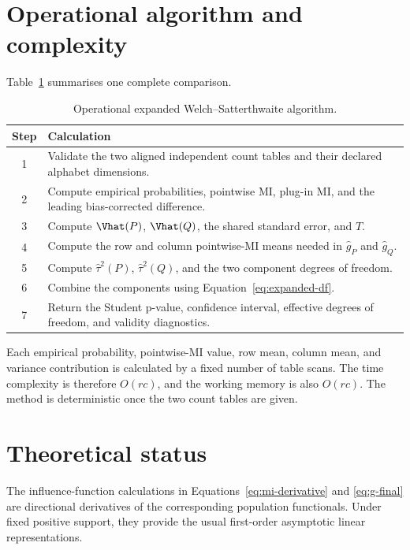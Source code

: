\section{Operational algorithm and complexity}

Table~\ref{tab:expanded-algorithm} summarises one complete comparison.

\begin{table}[htbp]
\centering
\caption{Operational expanded Welch--Satterthwaite algorithm.}
\label{tab:expanded-algorithm}
\begin{tabularx}{\textwidth}{@{}cX@{}}
\toprule
Step & Calculation \\
\midrule
1 & Validate the two aligned independent count tables and their declared alphabet dimensions. \\
2 & Compute empirical probabilities, pointwise MI, plug-in MI, and the leading bias-corrected difference. \\
3 & Compute \(\Vhat(P)\), \(\Vhat(Q)\), the shared standard error, and \(T\). \\
4 & Compute the row and column pointwise-MI means needed in \(\widehat g_P\) and \(\widehat g_Q\). \\
5 & Compute \(\widehat\tau^2(P)\), \(\widehat\tau^2(Q)\), and the two component degrees of freedom. \\
6 & Combine the components using Equation~\eqref{eq:expanded-df}. \\
7 & Return the Student p-value, confidence interval, effective degrees of freedom, and validity diagnostics. \\
\bottomrule
\end{tabularx}
\end{table}

Each empirical probability, pointwise-MI value, row mean, column mean, and
variance contribution is calculated by a fixed number of table scans. The
time complexity is therefore \(O(rc)\), and the working memory is also
\(O(rc)\). The method is deterministic once the two count tables are given.

\section{Theoretical status}

The influence-function calculations in Equations~\eqref{eq:mi-derivative}
and \eqref{eq:g-final} are directional derivatives of the corresponding
population functionals. Under fixed positive support, they provide the usual
first-order asymptotic linear representations.

